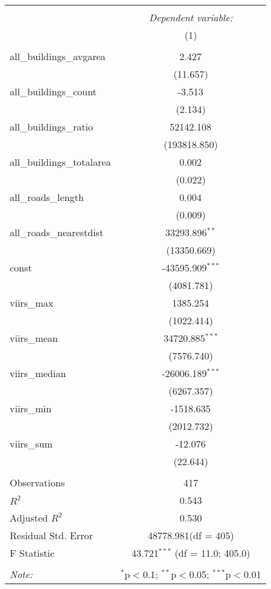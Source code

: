 \begin{table}[!htbp] \centering
\begin{tabular}{@{\extracolsep{5pt}}lc}
\\[-1.8ex]\hline
\hline \\[-1.8ex]
& \multicolumn{1}{c}{\textit{Dependent variable:}} \
\cr \cline{1-2}
\\[-1.8ex] & (1) \\
\hline \\[-1.8ex]
 all_buildings_avgarea & 2.427$^{}$ \\
  & (11.657) \\
 all_buildings_count & -3.513$^{}$ \\
  & (2.134) \\
 all_buildings_ratio & 52142.108$^{}$ \\
  & (193818.850) \\
 all_buildings_totalarea & 0.002$^{}$ \\
  & (0.022) \\
 all_roads_length & 0.004$^{}$ \\
  & (0.009) \\
 all_roads_nearestdist & 33293.896$^{**}$ \\
  & (13350.669) \\
 const & -43595.909$^{***}$ \\
  & (4081.781) \\
 viirs_max & 1385.254$^{}$ \\
  & (1022.414) \\
 viirs_mean & 34720.885$^{***}$ \\
  & (7576.740) \\
 viirs_median & -26006.189$^{***}$ \\
  & (6267.357) \\
 viirs_min & -1518.635$^{}$ \\
  & (2012.732) \\
 viirs_sum & -12.076$^{}$ \\
  & (22.644) \\
\hline \\[-1.8ex]
 Observations & 417 \\
 $R^2$ & 0.543 \\
 Adjusted $R^2$ & 0.530 \\
 Residual Std. Error & 48778.981(df = 405)  \\
 F Statistic & 43.721$^{***}$ (df = 11.0; 405.0) \\
\hline
\hline \\[-1.8ex]
\textit{Note:} & \multicolumn{1}{r}{$^{*}$p$<$0.1; $^{**}$p$<$0.05; $^{***}$p$<$0.01} \\
\end{tabular}
\end{table}